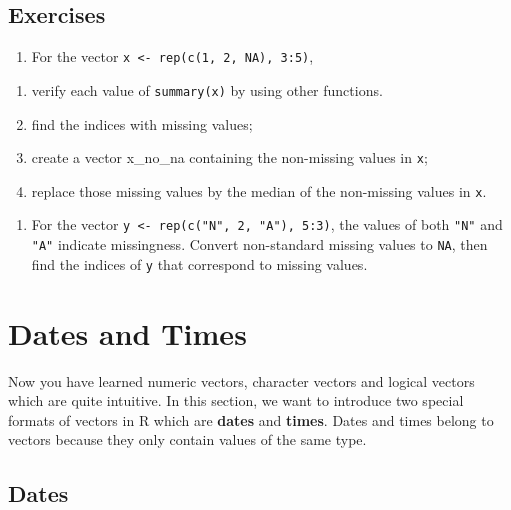 \documentclass[
]{book}
\providecommand{\tightlist}{%
  \setlength{\itemsep}{0pt}\setlength{\parskip}{0pt}}
\begin{document}
\hypertarget{exercises-11}{%
\subsection{Exercises}\label{exercises-11}}

\begin{enumerate}
\def\labelenumi{\arabic{enumi}.}
\tightlist
\item
  For the vector \texttt{x\ \textless{}-\ rep(c(1,\ 2,\ NA),\ 3:5)},
\end{enumerate}

\begin{enumerate}
\def\labelenumi{\alph{enumi}.}
\tightlist
\item
  verify each value of \texttt{summary(x)} by using other functions.
\item
  find the indices with missing values;
\item
  create a vector x\_no\_na containing the non-missing values in \texttt{x};
\item
  replace those missing values by the median of the non-missing values in \texttt{x}.
\end{enumerate}

\begin{enumerate}
\def\labelenumi{\arabic{enumi}.}
\setcounter{enumi}{1}
\tightlist
\item
  For the vector \texttt{y\ \textless{}-\ rep(c("N",\ 2,\ "A"),\ 5:3)}, the values of both \texttt{"N"} and \texttt{"A"} indicate missingness. Convert non-standard missing values to \texttt{NA}, then find the indices of \texttt{y} that correspond to missing values.
\end{enumerate}

\hypertarget{dates}{%
\section{Dates and Times}\label{dates}}

Now you have learned numeric vectors, character vectors and logical vectors which are quite intuitive. In this section, we want to introduce two special formats of vectors in R which are \textbf{dates} and \textbf{times}. Dates and times belong to vectors because they only contain values of the same type.

\hypertarget{dates-1}{%
\subsection{Dates}\label{dates-1}}
\end{document}
